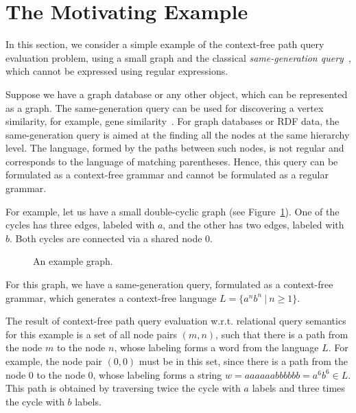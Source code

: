 \section{The Motivating Example}
\label{section_motivating}

In this section, we consider a simple example of the context-free path query evaluation problem, using a small graph and the classical \emph{same-generation query}~\cite{FndDB}, which cannot be expressed using regular expressions.

Suppose we have a graph database or any other object, which can be represented as a graph. The same-generation query can be used for discovering a vertex similarity, for example, gene similarity~\cite{GraphQueryWithEarley}. For graph databases or RDF data, the same-generation query is aimed at the finding all the nodes at the same hierarchy level. The language, formed by the paths between such nodes, is not regular and corresponds to the language of matching parentheses. Hence, this query can be formulated as a context-free grammar and cannot be formulated as a regular grammar.

For example, let us have a small double-cyclic graph (see Figure~\ref{Example_Graph}). One of the cycles has three edges, labeled with $a$, and the other has two edges, labeled with $b$. Both cycles are connected via a shared node $0$.

\begin{figure}[h]
\centering
{}
\caption{An example graph.}
\label{Example_Graph}
\end{figure}
	

For this graph, we have a same-generation query, formulated as a context-free grammar, which generates a context-free language \mbox{$L=\{a^n b^n~|~n \geq 1\}$}.

The result of context-free path query evaluation w.r.t. relational query semantics for this example is a set of all node pairs \mbox{$(m, n)$}, such that there is a path from the node $m$ to the node $n$, whose labeling forms a word from the language $L$. For example, the node pair \mbox{$(0,0)$} must be in this set, since there is a path from the node $0$ to the node $0$, whose labeling forms a string \mbox{$w = aaaaaabbbbbb = a^6b^6 \in L$}. This path is obtained by traversing twice the cycle with $a$ labels and three times the cycle with $b$ labels.